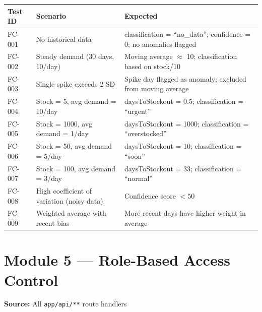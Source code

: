 \documentclass[12pt,a4paper]{report}
\begin{document}
\begin{longtable}{p{}p{}p{}}
    \toprule
    \textbf{Test ID} & \textbf{Scenario} & \textbf{Expected} \\
    \midrule
    \endhead
    FC-001 & No historical data & classification = ``no\_data''; confidence = 0; no anomalies flagged \\
    FC-002 & Steady demand (30 days, 10/day) & Moving average $\approx$ 10; classification based on stock/10 \\
    FC-003 & Single spike exceeds 2 SD & Spike day flagged as anomaly; excluded from moving average \\
    FC-004 & Stock = 5, avg demand = 10/day & daysToStockout = 0.5; classification = ``urgent'' \\
    FC-005 & Stock = 1000, avg demand = 1/day & daysToStockout = 1000; classification = ``overstocked'' \\
    FC-006 & Stock = 50, avg demand = 5/day & daysToStockout = 10; classification = ``soon'' \\
    FC-007 & Stock = 100, avg demand = 3/day & daysToStockout = 33; classification = ``normal'' \\
    FC-008 & High coefficient of variation (noisy data) & Confidence score $< 50$ \\
    FC-009 & Weighted average with recent bias & More recent days have higher weight in average \\
    \bottomrule
\end{longtable}

\section{Module 5 --- Role-Based Access Control}

\textbf{Source:} All \texttt{app/api/**} route handlers
\end{document}
